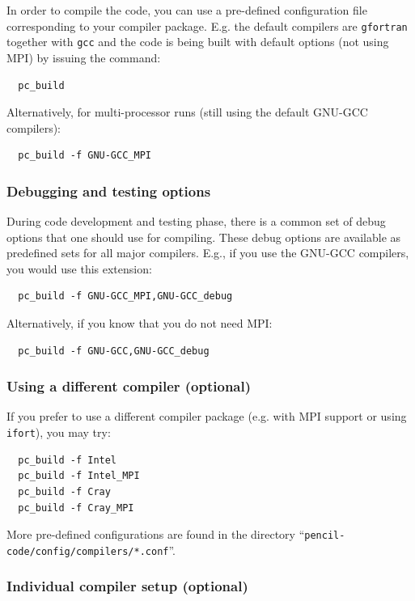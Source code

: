 \documentclass[a4paper,12pt]{article}
\newcommand{\command}[1]{\texttt{#1}}
\newcommand{\file}[1]{``\texttt{#1}''}
\newcommand{\name}[1]{\textsc{#1}}
\begin{document}
In order to compile the code, you can use a pre-defined configuration file corresponding to your compiler package.
E.g. the default compilers are \command{gfortran} together with \command{gcc} and the code is being built with default options (not using \name{MPI}) by issuing the command:

\begin{verbatim}
  pc_build
\end{verbatim}

Alternatively, for multi-processor runs (still using the default \name{GNU-GCC} compilers):
\begin{verbatim}
  pc_build -f GNU-GCC_MPI
\end{verbatim}


\subsubsection{Debugging and testing options}

During code development and testing phase, there is a common set of debug options that one should use for compiling.
These debug options are available as predefined sets for all major compilers.
E.g., if you use the \name{GNU-GCC} compilers, you would use this extension:
\begin{verbatim}
  pc_build -f GNU-GCC_MPI,GNU-GCC_debug
\end{verbatim}
Alternatively, if you know that you do not need MPI:
\begin{verbatim}
  pc_build -f GNU-GCC,GNU-GCC_debug
\end{verbatim}

\subsubsection{Using a different compiler (optional)}

If you prefer to use a different compiler package (e.g. with \name{MPI} support or using \command{ifort}), you may try:

\begin{verbatim}
  pc_build -f Intel
  pc_build -f Intel_MPI
  pc_build -f Cray
  pc_build -f Cray_MPI
\end{verbatim}

More pre-defined configurations are found in the directory \file{pencil-code/config/compilers/*.conf}.

\subsubsection{Individual compiler setup (optional)}
\end{document}
